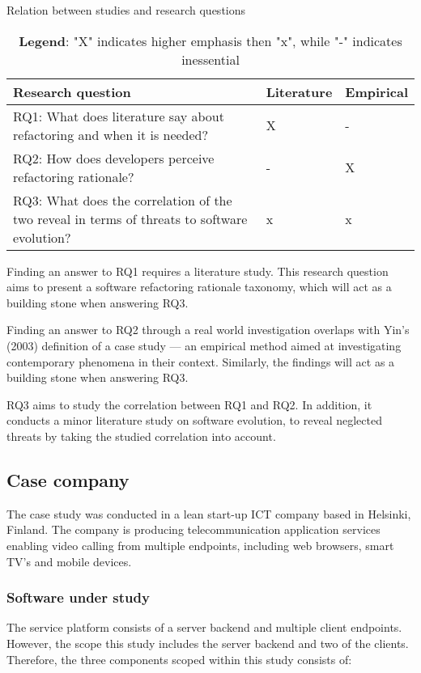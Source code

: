 \documentclass[english,12pt,a4paper,pdftex,sci,utf8]{aaltothesis}
\begin{document}
\begin{table}[ht!]
\centering
\caption{Relation between studies and research questions}
\label{table:researchQuestions}
    \begin{tabular}{ p{10cm} m{2cm} m{2cm}  }
     \hline
     \textbf{Research question}  &\textbf{Literature}  &\textbf{Empirical}  \\
     \hline
     RQ1: What does literature say about refactoring and when it is needed?                         &X      &-  \\
     \hline
     RQ2: How does developers perceive refactoring rationale?                                       &-      &X  \\
     \hline
     RQ3: What does the correlation of the two reveal in terms of threats to software evolution?    &x      &x  \\
     \hline
    \end{tabular}
\centering
\caption*{  \textbf{Legend}: "X" indicates higher emphasis then "x", while "-" indicates inessential}
\end{table}

Finding an answer to RQ1 requires a literature study. This research question aims to present a software refactoring rationale taxonomy, which will act as a building stone when answering RQ3.

Finding an answer to RQ2 through a real world investigation overlaps with Yin's (2003) definition of a case study --- an empirical method aimed at investigating contemporary phenomena in their context. Similarly, the findings will act as a building stone when answering RQ3.

RQ3 aims to study the correlation between RQ1 and RQ2. In addition, it conducts a minor literature study on software evolution, to reveal neglected threats by taking the studied correlation into account.

\subsection{Case company} \label{caseCompany}
The case study was conducted in a lean start-up ICT company based in Helsinki, Finland. The company is producing  telecommunication application services enabling video calling from multiple endpoints, including web browsers, smart TV's and mobile devices. 
\subsubsection*{Software under study} \label{software}
The service platform consists of a server backend and multiple client endpoints. However, the scope this study includes the server backend and two of the clients. Therefore, the three components scoped within this study consists of:
\end{document}
